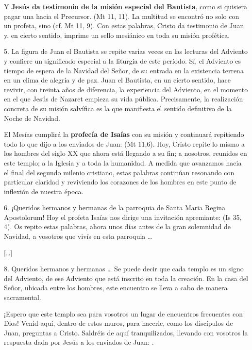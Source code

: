 Y \textbf{Jesús da testimonio de la misión especial del Bautista}, como si quisiera pagar una  hacia el Precursor.  (Mt 11, 11). La multitud se encontró no solo con un profeta, sino  (cf. Mt 11, 9). Con estas palabras, Cristo da testimonio de Juan y, en cierto sentido, imprime un sello mesiánico en toda su misión profética.

5. La figura de Juan el Bautista se repite varias veces en las lecturas del Adviento y confiere un significado especial a la liturgia de este período. Sí, el Adviento es tiempo de espera de la Navidad del Señor, de su entrada en la existencia terrena en un clima de alegría y de paz. Juan el Bautista, en un cierto sentido, hace revivir, con treinta años de diferencia, la experiencia del Adviento, en el momento en el que Jesús de Nazaret empieza su vida pública. Precisamente, la realización concreta de su misión salvífica es la que manifiesta el sentido definitivo de la Noche de Navidad.

El Mesías cumplirá la \textbf{profecía de Isaías} con su misión y continuará repitiendo todo lo que dijo a los enviados de Juan:  (Mt 11,6). Hoy, Cristo repite lo mismo a los hombres del siglo XX que ahora está llegando a su fin; a nosotros, reunidos en este templo; a la Iglesia y a toda la humanidad. A medida que avanzamos hacia el final del segundo milenio cristiano, estas palabras continúan resonando con particular claridad y reviviendo los corazones de los hombres en este punto de inflexión de nuestra época.

6. ¡Queridos hermanos y hermanas de la parroquia de Santa Maria Regina Apostolorum! Hoy el profeta Isaías nos dirige una invitación apremiante:  (Is 35, 4). Os repito estas palabras, ahora unos días antes de la gran solemnidad de Navidad, a vosotros que vivís en esta parroquia \ldots{}

{[}\ldots{}{]}

8. Queridos hermanos y hermanas \ldots{} Se puede decir que cada templo es un signo del Adviento, de ese Adviento que está inscrito en toda la creación. En la casa del Señor, ubicada entre los hombres, este encuentro se lleva a cabo de manera sacramental.

¡Espero que este templo sea para vosotros un lugar de encuentros frecuentes con Dios! Venid aquí, dentro de estos muros, para hacerle, como los discípulos de Juan, preguntas a Cristo. Saldréis de aquí tranquilizados, llevando con vosotros la respuesta dada por Jesús a los enviados de Juan: .

